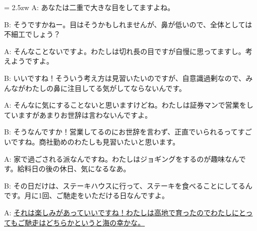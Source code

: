 \documentclass[11pt]{amsart}
\title{}
\author{}
\newenvironment{hangall}[1]{\hangindent = 2.5zw\everypar{\hangindent = 2.5zw}}{}
\begin{document}
\maketitle
\begin{hangall}{}%
A: あなたは二重で大きな目をしてますよね。

B: そうですかねー。目はそうかもしれませんが、鼻が低いので、全体としては不細工でしょう？

A: そんなことないですよ。わたしは切れ長の目ですが自慢に思ってますし。考えようですよ。

B: いいですね！そういう考え方は見習いたいのですが、自意識過剰なので、みんながわたしの鼻に注目してる気がしてならないんです。

A: そんなに気にすることないと思いますけどね。わたしは証券マンで営業をしていますがあまりお世辞は言わないんですよ。

B: そうなんですか！営業してるのにお世辞を言わず、正直でいられるってすごいですね。商社勤めのわたしも見習いたいと思います。

A: 家で過ごされる派なんですね。わたしはジョギングをするのが趣味なんです。給料日の後の休日、気になるなあ。

B: その日だけは、ステーキハウスに行って、ステーキを食べることにしてるんです。月に1回、ご馳走をいただける日なんですよ。

A: \ul{それは楽しみがあっていいですね！わたしは高地で育ったのでわたしにとってもご馳走はどちらかというと海の幸かな。}\end{hangall}
\end{document}

